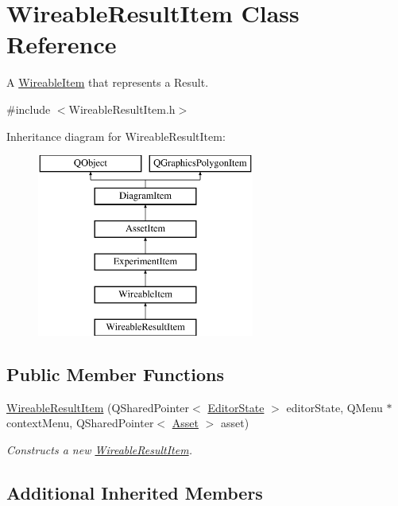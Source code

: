 \hypertarget{class_wireable_result_item}{\section{Wireable\-Result\-Item Class Reference}
\label{class_wireable_result_item}
}


A \hyperlink{class_wireable_item}{Wireable\-Item} that represents a Result.  




{\ttfamily \#include $<$Wireable\-Result\-Item.\-h$>$}

Inheritance diagram for Wireable\-Result\-Item\-:\begin{figure}[H]
\begin{center}
\leavevmode
\includegraphics[height=6.000000cm]{class_wireable_result_item}
\end{center}
\end{figure}
\subsection*{Public Member Functions}
\begin{DoxyCompactItemize}
\item 
\hyperlink{class_wireable_result_item_a423afbe9c13cb610f43cf575f16004e9}{Wireable\-Result\-Item} (Q\-Shared\-Pointer$<$ \hyperlink{class_editor_state}{Editor\-State} $>$ editor\-State, Q\-Menu $\ast$context\-Menu, Q\-Shared\-Pointer$<$ \hyperlink{class_picto_1_1_asset}{Asset} $>$ asset)
\begin{DoxyCompactList}\small\item\em Constructs a new \hyperlink{class_wireable_result_item}{Wireable\-Result\-Item}. \end{DoxyCompactList}\end{DoxyCompactItemize}
\subsection*{Additional Inherited Members}


